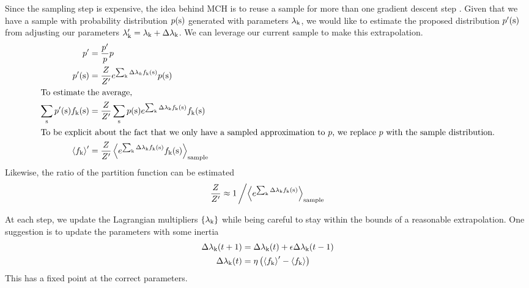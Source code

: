 \documentclass[aps,prl,twocolumn,nofootinbib]{revtex4-1}
\begin{document}
Since the sampling step is expensive, the idea behind MCH is to reuse a sample for more than one gradient descent step \cite{Broderick:2007wq}. Given that we have a sample with probability distribution $p({\rm s})$ generated with parameters $\lambda_{\rm k}$, we would like to estimate the proposed distribution $p'({\rm s})$ from adjusting our parameters $\lambda_{\rm k}' = \lambda_{\rm k}+\Delta\lambda_{\rm k}$. We can leverage our current sample to make this extrapolation.
\begin{align}
	p' &= \frac{p'}{p}p\\
	p'({\rm s})	&= \frac{Z}{Z'}e^{\sum_{\rm k} \Delta\lambda_k f_{\rm k}({\rm s})} p({\rm s})\\
\intertext{To estimate the average,}
	\sum_{\rm s} p'({\rm s}) f_{\rm k}({\rm s}) &= \frac{Z}{Z'} \sum_{\rm s} p({\rm s}) e^{\sum_{\rm k} \Delta\lambda_{\rm k} f_{\rm k}({\rm s})} f_{\rm k}({\rm s})\\
\intertext{To be explicit about the fact that we only have a sampled approximation to $p$, we replace $p$ with the sample distribution.}
	\left<f_{\rm k}\right>' &= \frac{Z}{Z'} \left<e^{\sum_{\rm k} \Delta\lambda_{\rm k} f_{\rm k}({\rm s})} f_{\rm k}({\rm s})\right>_{\rm sample}
\end{align}
Likewise, the ratio of the partition function can be estimated
\begin{align}
	\frac{Z}{Z'} \approx 1\left/\left<e^{\sum_{\rm k} \Delta\lambda_{\rm k} f_{\rm k}({\rm s})}\right>_{\rm sample}\right.
\end{align}

At each step, we update the Lagrangian multipliers $\{\lambda_{\rm k}\}$ while being careful to stay within the bounds of a reasonable extrapolation. One suggestion is to update the parameters with some inertia \cite{Tkacik:2006vq}
\begin{align}
	\Delta\lambda_{\rm k}(t+1) &= \Delta \lambda_{\rm k}(t) + \epsilon \Delta\lambda_{\rm k}(t-1)\label{eq:mch learn1}\\
	\Delta \lambda_{\rm k}(t) &= \eta\left(\left<f_{\rm k}\right>'-\left<f_{\rm k}\right>\right)\label{eq:mch learn2}
\end{align}
This has a fixed point at the correct parameters.
\end{document}
